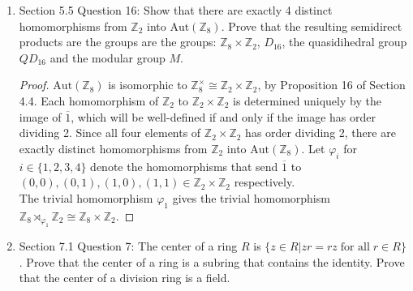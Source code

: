 \documentclass{article}
\begin{document}
\begin{enumerate}[label={\bf Q\arabic*:}]
\begin{proof}
      Next consider the case when $P=\mathbb{Z}_p\times\mathbb{Z}_p$. Now
      $\text{Aut}(\mathbb{Z}_p\times\mathbb{Z}_p)=\text{GL}_2(\mathbb{Z}_p)$,
      and every non-trivial element of order 2 in
      $\text{GL}_2(\mathbb{Z}_p)$ is conjugate to a diagonal matrix with
      $\pm1$'s on the diagonal, hence from Section 5.5 Question 6, there
      can be at most 4 groups of the form
      $(\mathbb{Z}_p\times\mathbb{Z}_p)\rtimes_{\varphi}\mathbb{Z}_2$,
      induced by the four distinct diagonal matrices with $\pm1$'s on the
      diagonal. We can ignore the case where $\varphi$ is obtained from the
      identity matrix $I$ because that will give an abelian group. Hence
      there are at most three distinct non-abelian groups of the form
      $(\mathbb{Z}_p\times\mathbb{Z}_p)\rtimes_{\varphi}\mathbb{Z}_2$.
    \end{proof}

  \item Section 5.5 Question 16: Show that there are exactly 4 distinct
    homomorphisms from $\mathbb{Z}_2$ into $\text{Aut}(\mathbb{Z}_8)$.
    Prove that the resulting semidirect products are the groups are the
    groups: $\mathbb{Z}_8\times\mathbb{Z}_2$, $D_{16}$, the quasidihedral
    group $QD_{16}$ and the modular group $M$.

    \begin{proof}
      $\text{Aut}(\mathbb{Z}_8)$ is isomorphic to
      $\mathbb{Z}_8^\times\cong\mathbb{Z}_2\times\mathbb{Z}_2$, by
      Proposition 16 of Section 4.4. Each homomorphism of $\mathbb{Z}_2$ to
      $\mathbb{Z}_2\times\mathbb{Z}_2$ is determined uniquely by the image of
      $\overline{1}$, which will be well-defined if and only if the image
      has order dividing 2. Since all four elements of
      $\mathbb{Z}_2\times\mathbb{Z}_2$ has order dividing 2, there are
      exactly distinct homomorphisms from $\mathbb{Z}_2$ into
      $\text{Aut}(\mathbb{Z}_8)$. Let $\varphi_i$ for $i\in\{1,2,3,4\}$
      denote the homomorphisms that send $\overline{1}$ to
      $(0,0),(0,1),(1,0),(1,1)\in\mathbb{Z}_2\times\mathbb{Z}_2$
      respectively. \\

      The trivial homomorphism $\varphi_1$ gives the trivial homomorphism
      $\mathbb{Z}_8\rtimes_{\varphi_1}\mathbb{Z}_2\cong\mathbb{Z}_8\times\mathbb{Z}_2$.
    \end{proof}

  \item Section 7.1 Question 7: The center of a ring $R$ is $\{z\in R|
    zr=rz\; \text{for all}\; r\in R\}$. Prove that the center of a ring is
    a subring that contains the identity. Prove that the center of a
    division ring is a field.


\end{enumerate}
\end{document}
